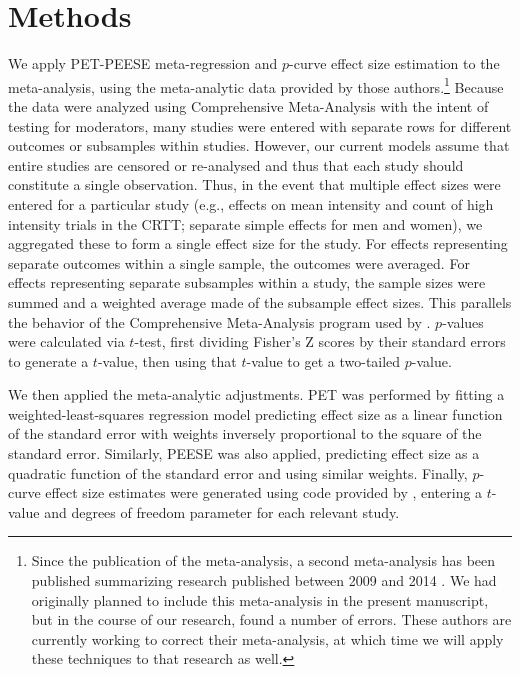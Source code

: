 \documentclass[man]{apa6}
\begin{document}
\section{Methods}
We apply PET-PEESE meta-regression and $p$-curve effect size estimation to the \citet{Anderson:etal:2010} meta-analysis, using the meta-analytic data provided by those authors.\footnote{Since the publication of the \citet{Anderson:etal:2010} meta-analysis, a second meta-analysis has been published summarizing research published between 2009 and 2014 \citep{Greitemeyer:Mugge:2014}. We had originally planned to include this meta-analysis in the present manuscript, but in the course of our research, found a number of errors. These authors are currently working to correct their meta-analysis, at which time we will apply these techniques to that research as well.} 
Because the data were analyzed using Comprehensive Meta-Analysis with the intent of testing for moderators, many studies were entered with separate rows for different outcomes or subsamples within studies. However, our current models assume that entire studies are censored or re-analysed and thus that each study should constitute a single observation. Thus, in the event that multiple effect sizes were entered for a particular study (e.g., effects on mean intensity and count of high intensity trials in the CRTT; separate simple effects for men and women), we aggregated these to form a single effect size for the study. For effects representing separate outcomes within a single sample, the outcomes were averaged. For effects representing separate subsamples within a study, the sample sizes were summed and a weighted average made of the subsample effect sizes. This parallels the behavior of the Comprehensive Meta-Analysis program used by \citet{Anderson:etal:2010}. $p$-values were calculated via $t$-test, first dividing Fisher's Z scores by their standard errors to generate a $t$-value, then using that $t$-value to get a two-tailed $p$-value.

We then applied the meta-analytic adjustments. PET was performed by fitting a weighted-least-squares regression model predicting effect size as a linear function of the standard error with weights inversely proportional to the square of the standard error. Similarly, PEESE was also applied, predicting effect size as a quadratic function of the standard error and using similar weights. Finally, $p$-curve effect size estimates were generated using code provided by \citet{Simonsohn:etal:2014}, entering a $t$-value and degrees of freedom parameter for each relevant study.
\end{document}
